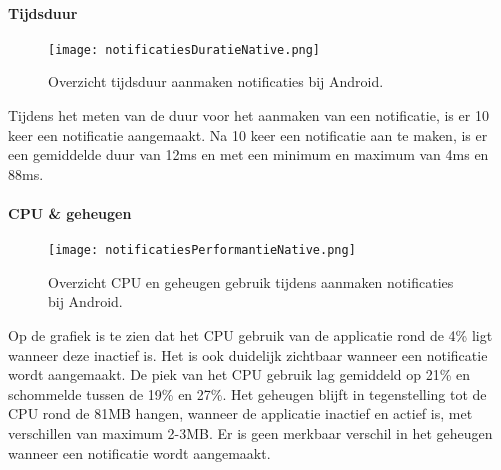 \paragraph{Tijdsduur}
\begin{figure}[H]
    \centering
    \texttt{[image: notificatiesDuratieNative.png]}
    \caption{Overzicht tijdsduur aanmaken notificaties bij Android.}
\end{figure}
Tijdens het meten van de duur voor het aanmaken van een notificatie, is er 
10 keer een notificatie aangemaakt. Na 10 keer een notificatie aan te maken, is er  
een gemiddelde duur van 12ms en met een minimum en 
maximum van 4ms en 88ms.

\paragraph{CPU \& geheugen}
\begin{figure}[H]
    \centering
    \texttt{[image: notificatiesPerformantieNative.png]}
    \caption{Overzicht CPU en geheugen gebruik tijdens aanmaken notificaties bij Android.}
\end{figure}
Op de grafiek is te zien dat het CPU gebruik van de applicatie rond de 4\% ligt wanneer deze inactief is. 
Het is ook duidelijk zichtbaar wanneer een notificatie wordt aangemaakt. De piek van het CPU gebruik lag 
gemiddeld op 21\% en schommelde tussen de 19\% en 27\%. Het geheugen blijft in tegenstelling tot de CPU 
rond de 81MB hangen, wanneer de applicatie inactief en actief is, met verschillen van maximum 2-3MB. Er is geen 
merkbaar verschil in het geheugen wanneer een notificatie wordt aangemaakt.
  